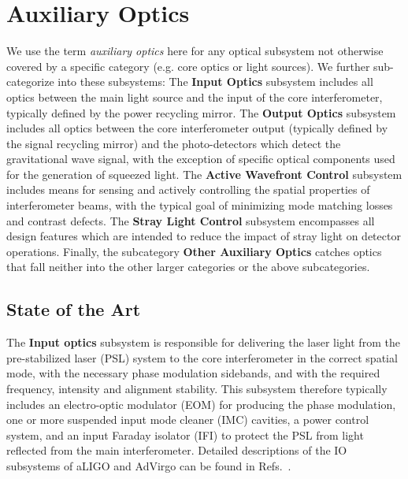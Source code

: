 \chapter{Auxiliary Optics}
\label{sec:Aux-optics}

\begin{samepage} %

We use the term \emph{auxiliary optics} here for any optical subsystem not otherwise covered by a specific category (e.g. core optics or light sources). We further sub-categorize into these subsystems:
The {\bf Input Optics} subsystem includes all optics between the main light source and the input of the core interferometer, typically defined by the power recycling mirror. The {\bf Output Optics} subsystem includes all optics between the core interferometer output (typically defined by the signal recycling mirror) and the photo-detectors which detect the gravitational wave signal, with the exception of specific optical components used for the generation of squeezed light. The {\bf Active Wavefront Control} subsystem includes means for sensing and actively controlling the spatial properties of interferometer beams, with the typical goal of minimizing mode matching losses and contrast defects. The {\bf Stray Light Control} subsystem encompasses all design features which are intended to reduce the impact of stray light on detector operations. Finally, the subcategory {\bf Other Auxiliary Optics} catches optics that fall neither into the other larger categories or the above 
subcategories.

\section{State of the Art}
The {\bf Input optics} subsystem is responsible for delivering the laser light from the pre-stabilized laser (PSL) system to the core interferometer in the correct spatial mode, with the necessary phase modulation sidebands, and with the required frequency, intensity and alignment stability. This subsystem therefore typically includes an electro-optic modulator (EOM) for producing the phase modulation, one or more suspended input mode cleaner (IMC) cavities, a power control system, and an input Faraday isolator (IFI) to protect the PSL from light reflected from the main interferometer. Detailed descriptions of the IO subsystems of \ac{aLIGO}  and AdVirgo can be found in Refs.~\cite{aLIGO_IO,IOchapter}. 

\end{samepage} %

